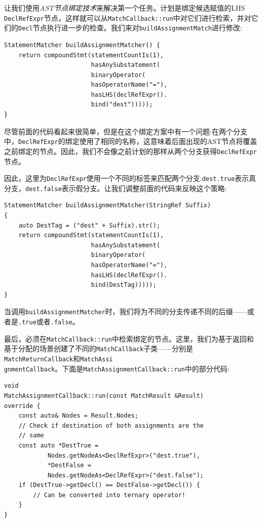\begin{enumerate}
让我们使用\textit{AST节点绑定技术}来解决第一个任务。计划是绑定候选赋值的LHS \texttt{DeclRefExpr}节点，这样就可以从\texttt{MatchCallback::run}中对它们进行检索，并对它们的\texttt{Decl}节点执行进一步的检查。我们来对\texttt{buildAssignmentMatch}进行修改:

\begin{lstlisting}[style=styleCXX]
StatementMatcher buildAssignmentMatcher() {
	return compoundStmt(statementCountIs(1),
						hasAnySubstatement(
						binaryOperator(
						hasOperatorName("="),
						hasLHS(declRefExpr().
						bind("dest")))));
}
\end{lstlisting}

尽管前面的代码看起来很简单，但是在这个绑定方案中有一个问题:在两个分支中，\texttt{DeclRefExpr}的绑定使用了相同的名称，这意味着后面出现的AST节点将覆盖之前绑定的节点。因此，我们不会像之前计划的那样从两个分支获得\texttt{DeclRefExpr}节点。

因此，这里为\texttt{DeclRefExpr}使用一个不同的标签来匹配两个分支:\texttt{dest.true}表示真分支，\texttt{dest.false}表示假分支。让我们调整前面的代码来反映这个策略:

\begin{lstlisting}[style=styleCXX]
StatementMatcher buildAssignmentMatcher(StringRef Suffix)
{
	auto DestTag = ("dest" + Suffix).str();
	return compoundStmt(statementCountIs(1),
						hasAnySubstatement(
						binaryOperator(
						hasOperatorName("="),
						hasLHS(declRefExpr().
						bind(DestTag)))));
}
\end{lstlisting}

当调用\texttt{buildAssignmentMatcher}时，我们将为不同的分支传递不同的后缀——或者是\texttt{.true}或者\texttt{.false}。

最后，必须在\texttt{MatchCallback::run}中检索绑定的节点。这里，我们为基于返回和基于分配的场景创建了不同的\texttt{MatchCallback}子类——分别是\texttt{MatchReturnCallback}和\texttt{MatchAssi\\gnmentCallback}。下面是\texttt{MatchAssignmentCallback::run}中的部分代码:

\begin{lstlisting}[style=styleCXX]
void
MatchAssignmentCallback::run(const MatchResult &Result)
override {
	const auto& Nodes = Result.Nodes;
	// Check if destination of both assignments are the
	// same
	const auto *DestTrue =
			Nodes.getNodeAs<DeclRefExpr>("dest.true"),
			*DestFalse =
			Nodes.getNodeAs<DeclRefExpr>("dest.false");
	if (DestTrue->getDecl() == DestFalse->getDecl()) {
		// Can be converted into ternary operator!
	}
}
\end{lstlisting}


\end{enumerate}
